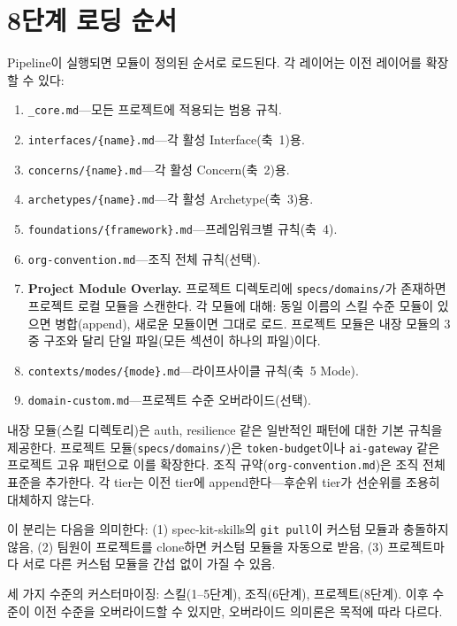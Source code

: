 \documentclass[11pt,a4paper,openright,twoside]{report}
\newcommand{\file}[1]{\texttt{#1}}
\begin{document}
\section{8단계 로딩 순서}
\label{sec:loading-order}

Pipeline이 실행되면 모듈이 정의된 순서로 로드된다. 각 레이어는 이전 레이어를 확장할 수 있다:

\begin{enumerate}
  \item \file{\_core.md}---모든 프로젝트에 적용되는 범용 규칙.
  \item \file{interfaces/\{name\}.md}---각 활성 Interface(축~1)용.
  \item \file{concerns/\{name\}.md}---각 활성 Concern(축~2)용.
  \item \file{archetypes/\{name\}.md}---각 활성 Archetype(축~3)용.
  \item \file{foundations/\{framework\}.md}---프레임워크별 규칙(축~4).
  \item \file{org-convention.md}---조직 전체 규칙(선택).
  \item[Step 6b] \textbf{Project Module Overlay.} 프로젝트 디렉토리에 \file{specs/domains/}가 존재하면 프로젝트 로컬 모듈을 스캔한다. 각 모듈에 대해: 동일 이름의 스킬 수준 모듈이 있으면 병합(append), 새로운 모듈이면 그대로 로드. 프로젝트 모듈은 내장 모듈의 3중 구조와 달리 단일 파일(모든 섹션이 하나의 파일)이다.
  \item \file{contexts/modes/\{mode\}.md}---라이프사이클 규칙(축~5 Mode).
  \item \file{domain-custom.md}---프로젝트 수준 오버라이드(선택).
\end{enumerate}

\begin{tipbox}
내장 모듈(스킬 디렉토리)은 auth, resilience 같은 일반적인 패턴에 대한 기본 규칙을 제공한다. 프로젝트 모듈(\file{specs/domains/})은 \texttt{token-budget}이나 \texttt{ai-gateway} 같은 프로젝트 고유 패턴으로 이를 확장한다. 조직 규약(\file{org-convention.md})은 조직 전체 표준을 추가한다. 각 tier는 이전 tier에 append한다---후순위 tier가 선순위를 조용히 대체하지 않는다.

이 분리는 다음을 의미한다: (1) spec-kit-skills의 \texttt{git pull}이 커스텀 모듈과 충돌하지 않음, (2) 팀원이 프로젝트를 clone하면 커스텀 모듈을 자동으로 받음, (3) 프로젝트마다 서로 다른 커스텀 모듈을 간섭 없이 가질 수 있음.
\end{tipbox}

세 가지 수준의 커스터마이징: 스킬(1--5단계), 조직(6단계), 프로젝트(8단계). 이후 수준이 이전 수준을 오버라이드할 수 있지만, 오버라이드 의미론은 목적에 따라 다르다.
\end{document}
